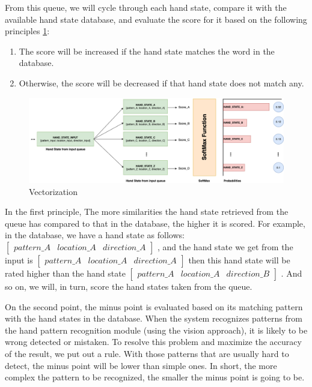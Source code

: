 From this queue, we will cycle through each hand state, compare it with the available hand state database, and evaluate the score for it based on the following principles \ref{fig:Chap4-Vectorization}:

\begin{enumerate}
  \item The score will be increased if the hand state matches the word in the database.
  \item Otherwise, the score will be decreased if that hand state does not match any.
\end{enumerate}

\begin{figure}[H]
  \centering
  \includegraphics[width=\textwidth]{img/Chap4/Vectorization.png}
  \caption{ Vectorization }
  \label{fig:Chap4-Vectorization}
\end{figure}
In the first principle, The more similarities the hand state retrieved from the queue has compared to that in the database, the higher it is scored. For example, in the database, we have a hand state as follows: 
$\begin{bmatrix}
  pattern \_ A & location \_ A & direction \_ A
\end{bmatrix}$
, and the hand state we get from the input is 
$\begin{bmatrix}
  pattern \_ A & location \_ A & direction \_ A
\end{bmatrix}$
then this hand state will be rated higher than the hand state 
$\begin{bmatrix}
  pattern \_ A & location \_ A & direction \_ B
\end{bmatrix}$
. And so on, we will, in turn, score the hand states taken from the queue.

On the second point, the minus point is evaluated based on its matching pattern with the hand states in the database. When the system recognizes patterns from the hand pattern recognition module (using the vision approach), it is likely to be wrong detected or mistaken. To resolve this problem and maximize the accuracy of the result, we put out a rule. With those patterns that are usually hard to detect, the minus point will be lower than simple ones. In short, the more complex the pattern to be recognized, the smaller the minus point is going to be.

